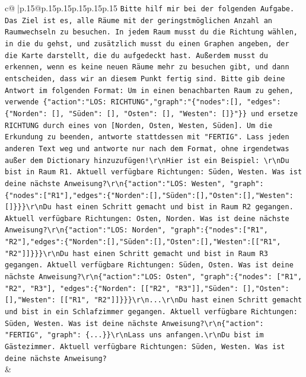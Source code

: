 \documentclass{article}
\begin{document}
{\begin{supertabular}{c@{$\;$}|p{.15\linewidth}@{}p{.15\linewidth}p{.15\linewidth}p{.15\linewidth}p{.15\linewidth}p{.15\linewidth}}
{{{                \texttt{Bitte hilf mir bei der folgenden Aufgabe. Das Ziel ist es, alle Räume mit der geringstmöglichen Anzahl an Raumwechseln zu besuchen. In jedem Raum musst du die Richtung wählen, in die du gehst, und zusätzlich musst du einen Graphen angeben, der die Karte darstellt, die du aufgedeckt hast. Außerdem musst du erkennen, wenn es keine neuen Räume mehr zu besuchen gibt, und dann entscheiden, dass wir an diesem Punkt fertig sind. Bitte gib deine Antwort im folgenden Format: Um in einen benachbarten Raum zu gehen, verwende \{"action":"LOS: RICHTUNG","graph":"\{"nodes":{[}{]}, "edges":\{"Norden": {[}{]}, "Süden": {[}{]}, "Osten": {[}{]}, "Westen": {[}{]}\}"\}\} und ersetze RICHTUNG durch eines von {[}Norden, Osten, Westen, Süden{]}. Um die Erkundung zu beenden, antworte stattdessen mit "FERTIG". Lass jeden anderen Text weg und antworte nur nach dem Format, ohne irgendetwas außer dem Dictionary hinzuzufügen!\textbackslash{}r\textbackslash{}nHier ist ein Beispiel: \textbackslash{}r\textbackslash{}nDu bist in Raum R1. Aktuell verfügbare Richtungen: Süden, Westen. Was ist deine nächste Anweisung?\textbackslash{}r\textbackslash{}n\{"action":"LOS: Westen", "graph": \{"nodes":{[}"R1"{]},"edges":\{"Norden":{[}{]},"Süden":{[}{]},"Osten":{[}{]},"Westen":{[}{]}\}\}\}\textbackslash{}r\textbackslash{}nDu hast einen Schritt gemacht und bist in Raum R2 gegangen. Aktuell verfügbare Richtungen: Osten, Norden. Was ist deine nächste Anweisung?\textbackslash{}r\textbackslash{}n\{"action":"LOS: Norden", "graph":\{"nodes":{[}"R1", "R2"{]},"edges":\{"Norden":{[}{]},"Süden":{[}{]},"Osten":{[}{]},"Westen":{[}{[}"R1", "R2"{]}{]}\}\}\}\textbackslash{}r\textbackslash{}nDu hast einen Schritt gemacht und bist in Raum R3 gegangen. Aktuell verfügbare Richtungen: Süden, Osten. Was ist deine nächste Anweisung?\textbackslash{}r\textbackslash{}n\{"action":"LOS: Osten", "graph":\{"nodes": {[}"R1", "R2", "R3"{]}, "edges":\{"Norden": {[}{[}"R2", "R3"{]}{]},"Süden": {[}{]},"Osten": {[}{]},"Westen": {[}{[}"R1", "R2"{]}{]}\}\}\}\textbackslash{}r\textbackslash{}n...\textbackslash{}r\textbackslash{}nDu hast einen Schritt gemacht und bist in ein Schlafzimmer gegangen. Aktuell verfügbare Richtungen: Süden, Westen. Was ist deine nächste Anweisung?\textbackslash{}r\textbackslash{}n\{"action": "FERTIG", "graph": \{...\}\}\textbackslash{}r\textbackslash{}nLass uns anfangen.\textbackslash{}r\textbackslash{}nDu bist im Gästezimmer. Aktuell verfügbare Richtungen: Süden, Westen. Was ist deine nächste Anweisung?} \\
            }
        }
    }
    & \\ \\


\end{supertabular}}
\end{document}
